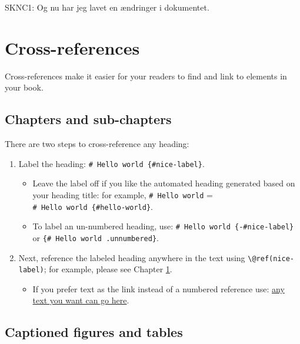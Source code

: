 \documentclass[
]{book}
\providecommand{\tightlist}{%
  \setlength{\itemsep}{0pt}\setlength{\parskip}{0pt}}
\theoremstyle{definition}
\theoremstyle{definition}
\theoremstyle{definition}
\theoremstyle{definition}
\theoremstyle{remark}
\begin{document}
SKNC1: Og nu har jeg lavet en ændringer i dokumentet.

\hypertarget{cross}{%
\chapter{Cross-references}\label{cross}}

Cross-references make it easier for your readers to find and link to elements in your book.

\hypertarget{chapters-and-sub-chapters}{%
\section{Chapters and sub-chapters}\label{chapters-and-sub-chapters}}

There are two steps to cross-reference any heading:

\begin{enumerate}
\def\labelenumi{\arabic{enumi}.}
\tightlist
\item
  Label the heading: \texttt{\#\ Hello\ world\ \{\#nice-label\}}.

  \begin{itemize}
  \tightlist
  \item
    Leave the label off if you like the automated heading generated based on your heading title: for example, \texttt{\#\ Hello\ world} = \texttt{\#\ Hello\ world\ \{\#hello-world\}}.
  \item
    To label an un-numbered heading, use: \texttt{\#\ Hello\ world\ \{-\#nice-label\}} or \texttt{\{\#\ Hello\ world\ .unnumbered\}}.
  \end{itemize}
\item
  Next, reference the labeled heading anywhere in the text using \texttt{\textbackslash{}@ref(nice-label)}; for example, please see Chapter \ref{cross}.

  \begin{itemize}
  \tightlist
  \item
    If you prefer text as the link instead of a numbered reference use: \protect\hyperlink{cross}{any text you want can go here}.
  \end{itemize}
\end{enumerate}

\hypertarget{captioned-figures-and-tables}{%
\section{Captioned figures and tables}\label{captioned-figures-and-tables}}
\end{document}

